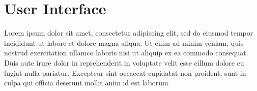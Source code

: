 \sectionfont{\fontsize{14}{14}\selectfont}
\section{User Interface}

Lorem ipsum dolor sit amet, consectetur adipiscing elit, sed do eiusmod tempor incididunt ut labore et dolore magna aliqua. Ut enim ad minim veniam, quis nostrud exercitation ullamco laboris nisi ut aliquip ex ea commodo consequat. Duis aute irure dolor in reprehenderit in voluptate velit esse cillum dolore eu fugiat nulla pariatur. Excepteur sint occaecat cupidatat non proident, sunt in culpa qui officia deserunt mollit anim id est laborum.



